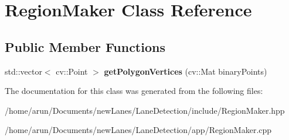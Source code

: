 \hypertarget{classRegionMaker}{}\section{Region\+Maker Class Reference}
\label{classRegionMaker}
\subsection*{Public Member Functions}
\begin{DoxyCompactItemize}
\item 
std\+::vector$<$ cv\+::\+Point $>$ {\bfseries get\+Polygon\+Vertices} (cv\+::\+Mat binary\+Points)\hypertarget{classRegionMaker_af10bebc57db52bf35958640bbeab8983}{}\label{classRegionMaker_af10bebc57db52bf35958640bbeab8983}

\end{DoxyCompactItemize}


The documentation for this class was generated from the following files\+:\begin{DoxyCompactItemize}
\item 
/home/arun/\+Documents/new\+Lanes/\+Lane\+Detection/include/Region\+Maker.\+hpp\item 
/home/arun/\+Documents/new\+Lanes/\+Lane\+Detection/app/Region\+Maker.\+cpp\end{DoxyCompactItemize}
